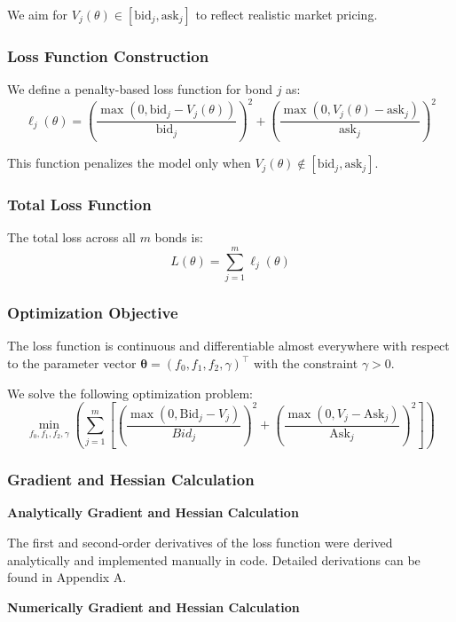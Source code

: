 \documentclass[12pt]{article}
\begin{document}
We aim for \( V_j(\theta) \in [\text{bid}_j, \text{ask}_j] \) to reflect realistic market pricing.

\subsubsection{Loss Function Construction}

We define a penalty-based loss function for bond \( j \) as:
\[
\ell_j(\theta) =
\left( \frac{\max(0, \text{bid}_j - V_j(\theta))}{\text{bid}_j} \right)^2 +
\left( \frac{\max(0, V_j(\theta) - \text{ask}_j)}{\text{ask}_j} \right)^2
\]

This function penalizes the model only when \( V_j(\theta) \notin [\text{bid}_j, \text{ask}_j]  \).

\subsubsection{Total Loss Function}

The total loss across all \( m \) bonds is:
\[
L(\theta) = \sum_{j=1}^m \ell_j(\theta)
\]

\subsubsection{Optimization Objective}

The loss function is continuous and differentiable almost everywhere with respect to the parameter vector \( \boldsymbol{\theta} = (f_0, f_1, f_2, \gamma)^\top \) with the constraint \( \gamma > 0 \). 

We solve the following optimization problem:
\[
\min_{f_0, f_1, f_2, \gamma} \left(
\sum_{j=1}^m \left[
\left( \frac{\max(0, \text{Bid}_j - V_j)}{{Bid}_j} \right)^2 +
\left( \frac{\max(0, V_j - \text{Ask}_j)}{\text{Ask}_j} \right)^2
\right]
\right)
\]

\subsubsection{Gradient and Hessian Calculation}

\textbf{Analytically Gradient and Hessian Calculation}

The first and second-order derivatives of the loss function were derived analytically and implemented manually in code. Detailed derivations can be found in Appendix A. 

\textbf{Numerically Gradient and Hessian Calculation}
\end{document}
